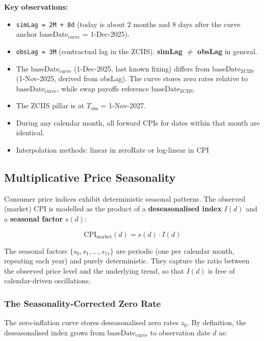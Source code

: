 \documentclass[11pt,a4paper]{article}
\newcommand{\code}[1]{\texttt{#1}}
\begin{document}
\noindent\textbf{Key observations:}
\begin{itemize}
\item \code{simLag = 2M + 8d} (today is about 2 months and 8 days after the curve anchor $\text{baseDate}_{\text{curve}}$ = 1-Dec-2025).
\item \code{obsLag = 3M} (contractual lag in the ZCIIS). \textbf{simLag $\neq$ obsLag} in general.
\item The $\text{baseDate}_{\text{curve}}$ (1-Dec-2025, last known fixing) differs from $\text{baseDate}_{\text{ZCIIS}}$ (1-Nov-2025, derived from obsLag). The curve stores zero rates relative to $\text{baseDate}_{\text{curve}}$, while swap payoffs reference $\text{baseDate}_{\text{ZCIIS}}$.
\item The ZCIIS pillar is at $T_{\text{obs}}$ = 1-Nov-2027.
\item During any calendar month, all forward CPIs for dates within that month are identical.
\item Interpolation methods: linear in zeroRate or log-linear in CPI
\end{itemize}

\subsection{Multiplicative Price Seasonality}

Consumer price indices exhibit deterministic seasonal patterns. The observed (market) CPI is modelled as the product of a \textbf{deseasonalised index} $I(d)$ and a \textbf{seasonal factor} $s(d)$:

\begin{equation}
\text{CPI}_{\text{market}}(d) = s(d) \cdot I(d)
\end{equation}

The seasonal factors $\{s_0, s_1, \ldots, s_{11}\}$ are periodic (one per calendar month, repeating each year) and purely deterministic. They capture the ratio between the observed price level and the underlying trend, so that $I(d)$ is free of calendar-driven oscillations.

\subsubsection{The Seasonality-Corrected Zero Rate}

The zero-inflation curve stores deseasonalised zero rates $z_0$. By definition, the deseasonalised index grows from $\text{baseDate}_{\text{curve}}$ to observation date $d$ as:
\end{document}
